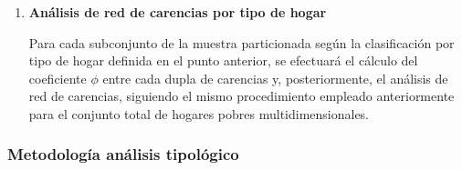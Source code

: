 \documentclass[12pt,letterpaper,spanish]{article}
\begin{document}
\begin{enumerate}
\begin{itemize}
\end{itemize}

\vspace{2em}


\item \textbf{Análisis de red de carencias por tipo de hogar}

Para cada subconjunto de la muestra particionada según la clasificación por tipo de hogar definida en el punto anterior, se efectuará el cálculo del coeficiente $\phi$ entre cada dupla de carencias y, posteriormente, el análisis de red de carencias, siguiendo el mismo procedimiento empleado anteriormente para el conjunto total de hogares pobres multidimensionales.

\end{enumerate}




\subsubsection{Metodología análisis tipológico}
\end{document}
